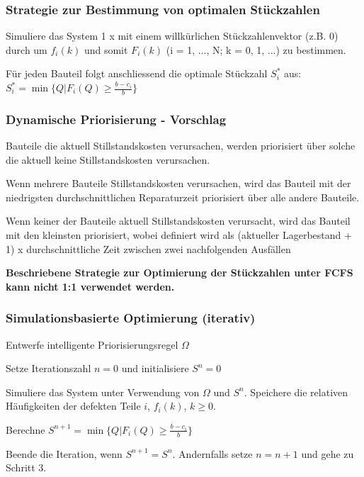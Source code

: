 \subsubsection{Strategie zur Bestimmung von optimalen Stückzahlen}
\begin{compactenum}
	\item Simuliere das System 1 x mit einem willkürlichen Stückzahlenvektor (z.B. 0) durch um $f_i(k)$ und somit $F_i(k)$ (i = 1, ..., N; k = 0, 1, ...) zu bestimmen.
	\item Für jeden Bauteil folgt anschliessend die optimale Stückzahl $S_i^*$ aus:	$S_i^* = \min \{Q|F_i(Q) \geq\frac{b-c_i}{b}\}$
\end{compactenum}

\subsubsection{Dynamische Priorisierung - Vorschlag}
\begin{compactenum}
	\item Bauteile die aktuell Stillstandskosten verursachen, werden priorisiert über solche die aktuell keine Stillstandskosten verursachen.
	\item Wenn mehrere Bauteile Stillstandskosten verursachen, wird das Bauteil mit der niedrigsten durchschnittlichen Reparaturzeit priorisiert über alle andere Bauteile.
	\item Wenn keiner der Bauteile aktuell Stillstandskosten verursacht, wird das Bauteil mit den kleinsten  priorisiert, wobei  definiert wird als (aktueller Lagerbestand + 1) x durchschnittliche Zeit zwischen zwei nachfolgenden Ausfällen
\end{compactenum}
\textbf{Beschriebene Strategie zur Optimierung der Stückzahlen unter FCFS kann nicht 1:1 verwendet werden.}

\subsubsection{Simulationsbasierte Optimierung (iterativ)}
\begin{compactenum}
	\item Entwerfe intelligente Priorisierungsregel $\Omega$
	\item Setze Iterationszahl $n = 0$ und initialisiere $S^n = 0$
	\item  Simuliere das System unter Verwendung von $\Omega$ und $S^n$. Speichere die relativen Häufigkeiten der defekten Teile $i$, $f_i(k)$, $k \geq 0$.
	\item Berechne $S^{n+1} = \min \{Q|F_i(Q) \geq\frac{b-c_i}{b}\}$
	\item Beende die Iteration, wenn $S^{n+1} = S^n$. Andernfalls setze $n = n + 1$ und gehe zu Schritt 3.
\end{compactenum}